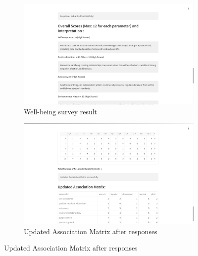 \begin{figure}[h!]
    \centering
    \begin{subfigure}[b]{0.495\textwidth}
        \centering
        \includegraphics[width=\textwidth]{App Images/30 Interface.png}
        \caption*{Well-being survey result}
        \label{fig:wellbeing_questions}
    \end{subfigure}
    \hfill
    \begin{subfigure}[b]{0.495\textwidth}
        \centering
        \includegraphics[width=\textwidth]{App Images/31 Interface.png}
        \caption*{Updated Association Matrix after responses}
        \label{fig:wellbeing_result}
    \end{subfigure}
    \label{fig:wellbeing_comparison}
\end{figure}

